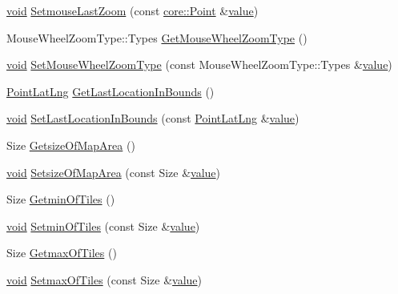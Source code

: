 \begin{DoxyCompactItemize}
\item 
\hyperlink{group___u_a_v_objects_plugin_ga444cf2ff3f0ecbe028adce838d373f5c}{void} \hyperlink{group___o_p_map_widget_ga04c566589849ca7f9b3357accf403a55}{Setmouse\-Last\-Zoom} (const \hyperlink{structcore_1_1_point}{core\-::\-Point} \&\hyperlink{glext_8h_aa0e2e9cea7f208d28acda0480144beb0}{value})
\item 
Mouse\-Wheel\-Zoom\-Type\-::\-Types \hyperlink{group___o_p_map_widget_gaaf45ca5113dc967072f68d3785b6089b}{Get\-Mouse\-Wheel\-Zoom\-Type} ()
\item 
\hyperlink{group___u_a_v_objects_plugin_ga444cf2ff3f0ecbe028adce838d373f5c}{void} \hyperlink{group___o_p_map_widget_ga605f19f8d878c649a0c0fe7aefde25c7}{Set\-Mouse\-Wheel\-Zoom\-Type} (const Mouse\-Wheel\-Zoom\-Type\-::\-Types \&\hyperlink{glext_8h_aa0e2e9cea7f208d28acda0480144beb0}{value})
\item 
\hyperlink{structinternals_1_1_point_lat_lng}{Point\-Lat\-Lng} \hyperlink{group___o_p_map_widget_ga9869340265138d874099cdffed04d95a}{Get\-Last\-Location\-In\-Bounds} ()
\item 
\hyperlink{group___u_a_v_objects_plugin_ga444cf2ff3f0ecbe028adce838d373f5c}{void} \hyperlink{group___o_p_map_widget_ga49e6ed17c97e596b9fb3103b63816212}{Set\-Last\-Location\-In\-Bounds} (const \hyperlink{structinternals_1_1_point_lat_lng}{Point\-Lat\-Lng} \&\hyperlink{glext_8h_aa0e2e9cea7f208d28acda0480144beb0}{value})
\item 
Size \hyperlink{group___o_p_map_widget_gafbcd83a2c5548f22c6cbb52a09ff402d}{Getsize\-Of\-Map\-Area} ()
\item 
\hyperlink{group___u_a_v_objects_plugin_ga444cf2ff3f0ecbe028adce838d373f5c}{void} \hyperlink{group___o_p_map_widget_ga2e491fd5e0849b99f2d9d180c71cb68d}{Setsize\-Of\-Map\-Area} (const Size \&\hyperlink{glext_8h_aa0e2e9cea7f208d28acda0480144beb0}{value})
\item 
Size \hyperlink{group___o_p_map_widget_gaa4181b7edf2df8de57265234f1068b67}{Getmin\-Of\-Tiles} ()
\item 
\hyperlink{group___u_a_v_objects_plugin_ga444cf2ff3f0ecbe028adce838d373f5c}{void} \hyperlink{group___o_p_map_widget_gaf34f47548612f5dcf275002aa9b3466c}{Setmin\-Of\-Tiles} (const Size \&\hyperlink{glext_8h_aa0e2e9cea7f208d28acda0480144beb0}{value})
\item 
Size \hyperlink{group___o_p_map_widget_gaa2cd678b4016f6334bfef3c1c8ac3b03}{Getmax\-Of\-Tiles} ()
\item 
\hyperlink{group___u_a_v_objects_plugin_ga444cf2ff3f0ecbe028adce838d373f5c}{void} \hyperlink{group___o_p_map_widget_gab059331f4276245f3415728687b72659}{Setmax\-Of\-Tiles} (const Size \&\hyperlink{glext_8h_aa0e2e9cea7f208d28acda0480144beb0}{value})

\end{DoxyCompactItemize}
